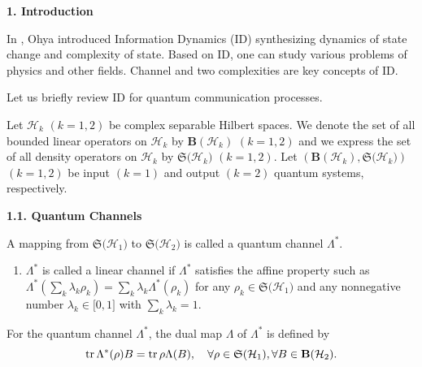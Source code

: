 
\date{14/XI/2012}




\makeengtitlef

\smallskip


\textbf{1. Introduction}

In \cite{nv:-O3}, Ohya introduced Information Dynamics (ID) synthesizing
dynamics of state change and complexity of state. Based on ID, one can study
various problems of physics and other fields. Channel and two complexities
are key concepts of ID.

Let us briefly review ID  for quantum communication processes.

Let  $  \mathcal{H}_{k} $    $  (k=1, 2) $   be complex separable Hilbert spaces.   We
denote the set of all bounded linear operators on  $  \mathcal{H}_{k} $   by  $  %
\mathbf{B}(\mathcal{H}_{k}) $    $  (k=1, 2) $   and we express the set of all density
operators on  $  \mathcal{H}_{k} $   by  $  \mathfrak{S(}\mathcal{H}_{k}) $    $  (k=1, 2) $.
  Let  $  \left( \mathbf{B}(\mathcal{H}_{k}),\mathfrak{S(}\mathcal{H}%
_{k})\right)  $    $  (k=1, 2) $   be input  $  (k=1) $   and output  $  (k=2) $   quantum
systems, respectively.

\smallskip

\textbf{1.1. Quantum Channels}

A mapping from  $  \mathfrak{S(}\mathcal{H}_{1}) $   to  $  \mathfrak{S(}\mathcal{H}%
_{2}) $   is called a quantum channel  $  \Lambda ^{\ast } $.

\begin{enumerate}
\item[(1)]  $  \Lambda ^{\ast } $  \textit{  }is called a linear channel if  $  %
\Lambda ^{\ast } $   satisfies the affine property such as  $  \Lambda ^{\ast
}(\sum_{k}\lambda _{k}\rho _{k})=\sum_{k}\lambda _{k}\Lambda ^{\ast }\left(
\rho _{k}\right)  $   for any  $  \rho _{k}\in \mathfrak{S(}\mathcal{H}_{1}) $   and
any nonnegative number  $  \lambda _{k}\in \lbrack 0,1] $   with  $  \sum_{k}\lambda
_{k}=1 $.
\end{enumerate}

For the quantum channel  $  \Lambda ^{\ast } $,   the dual map  $  \Lambda  $   of  $  %
\Lambda ^{\ast } $   is defined by 
\[
\mathop{\rm tr}\Lambda ^{\ast }(\rho )B=\mathop{\rm tr}\rho \Lambda (B),\quad \forall \rho \in 
\mathfrak{S(}\mathcal{H}_{1}),    \forall B\in \mathbf{B}(\mathcal{H}_{2}). 
\]

